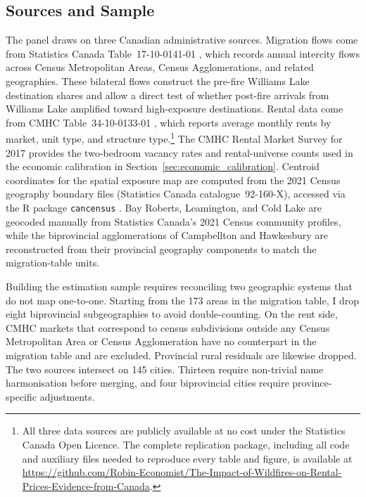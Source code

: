 \documentclass[12pt]{article}
\begin{document}
\subsection{Sources and Sample}
\label{sec:sources_sample}

The panel draws on three Canadian administrative sources. Migration flows
come from Statistics Canada Table~17-10-0141-01 \citep{statcan_migration},
which records annual intercity flows across Census Metropolitan Areas,
Census Agglomerations, and related geographies. These bilateral flows
construct the pre-fire Williams Lake destination shares and allow a
direct test of whether post-fire arrivals from Williams Lake amplified
toward high-exposure destinations. Rental data come from CMHC
Table~34-10-0133-01 \citep{cmhc_rental}, which reports average monthly
rents by market, unit type, and structure type.\footnote{All three data sources are publicly available at no cost under the Statistics Canada Open Licence. The complete replication package, including all code and auxiliary files needed to reproduce every table and figure, is available at \url{https://github.com/Robin-Economist/The-Impact-of-Wildfires-on-Rental-Prices-Evidence-from-Canada}.}
The CMHC Rental Market Survey for 2017 provides the two-bedroom vacancy
rates and rental-universe counts used in the economic calibration in
Section~\ref{sec:economic_calibration}. Centroid coordinates for the
spatial exposure map are computed from the 2021 Census geography boundary
files (Statistics Canada catalogue~92-160-X), accessed via the R package
\texttt{cancensus} \citep{vonBergmann2021}. Bay Roberts, Leamington, and
Cold Lake are geocoded manually from Statistics Canada's 2021 Census
community profiles, while the biprovincial agglomerations of Campbellton
and Hawkesbury are reconstructed from their provincial geography components
to match the migration-table units.

Building the estimation sample requires reconciling two geographic systems
that do not map one-to-one. Starting from the 173 areas in the migration
table, I drop eight biprovincial subgeographies to avoid double-counting.
On the rent side, CMHC markets that correspond to census subdivisions
outside any Census Metropolitan Area or Census Agglomeration have no
counterpart in the migration table and are excluded. Provincial rural
residuals are likewise dropped. The two sources intersect on 145 cities.
Thirteen require non-trivial name harmonisation before merging, and four
biprovincial cities require province-specific adjustments.
\end{document}
